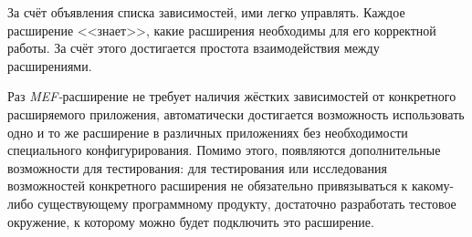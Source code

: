 За счёт объявления списка зависимостей, ими легко управлять. Каждое расширение <<знает>>, какие расширения необходимы для его корректной работы. За счёт этого достигается простота взаимодействия между расширениями.

Раз {\it MEF-}расширение не требует наличия жёстких зависимостей от конкретного расширяемого приложения, автоматически достигается возможность использовать одно и то же расширение в различных приложениях без необходимости специального конфигурирования. Помимо этого, появляются дополнительные возможности для тестирования: для тестирования или исследования возможностей конкретного расширения не обязательно привязываться к какому-либо существующему программному продукту, достаточно разработать тестовое окружение, к которому можно будет подключить это расширение.
